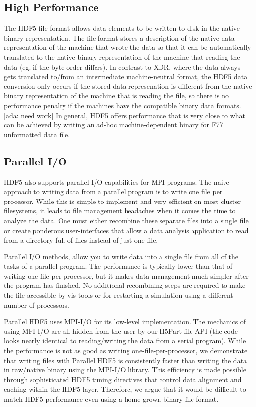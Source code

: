 \documentclass[acus]{JAC2003}
\begin{document}
\subsection{High Performance}  
The HDF5 file format allows data elements to be written to disk in the
native binary representation.  The file format stores a description of
the native data representation of the machine that wrote the data so
that it can be automatically translated to the native binary
representation of the machine that reading the data (eg. if the byte
order differs). In contrast to XDR, where the data always gets
translated to/from an intermediate machine-neutral format, the HDF5
data conversion only occurs if the stored data represenation is
different from the native binary representation of the machine that is
reading the file, so there is no performance penalty if the machines
have the compatible binary data formats. [ada: need work] In general, HDF5 offers
performance that is very close to what can be achieved by writing an
ad-hoc machine-dependent binary for F77 unformatted data file.

\subsection{Parallel I/O}
HDF5 also supports parallel I/O capabilities for MPI programs. 
The naive approach to writing data from a parallel program is to
write one file per processor.  While this is simple to implement and
very efficient on most cluster filesystems, it leads to file management 
headaches when it comes the time to analyze the data.  One must either
recombine these separate files into a single file or create ponderous
user-interfaces that allow a data analysis application to read from a
directory full of files instead of just one file.

Parallel I/O methods, allow you to write data into a single file from all
of the tasks of a parallel program.  The performance is typically lower
than that of writing one-file-per-processor, but it makes data management
much simpler after the program has finished.  No additional recombining
steps are required to make the file accessible by vis-tools or for
restarting a simulation using a different number of processors.

Parallel HDF5 uses MPI-I/O for its low-level implementation.  The 
mechanics of using MPI-I/O are all hidden from the user by our
H5Part file API (the code looks nearly identical to reading/writing the data
from a serial program).  While the performance is not as good as
writing one-file-per-processor, we demonstrate that writing files
with Parallel HDF5 is consistently faster than writing the data
in raw/native binary using the MPI-I/O library.  This efficiency is
made possible through sophisticated HDF5 tuning directives that
control data alignment and caching within the HDF5 layer.  
Therefore, we argue that it would be difficult to match
HDF5 performance even using a home-grown binary file format.
\end{document}
